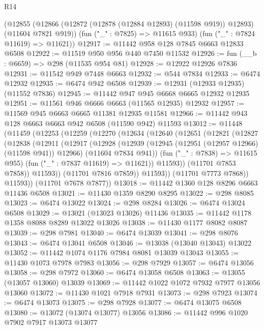 \begin{lexlean}{R14}
\begin{coremodule}
    (@12855
      (@12866 (@12872 (@12878 (@12884 @12893) (@11598 @919)) @12893) (@11604 @7821 @919))
      (fun ("_" : @7825) => @11615 @933)
      (fun ("_" : @7824 @11619) => @11621))
@12917 := @11442 @958 @128 @7845 @6663 @12833 @6508
@12922 := @11519 @950 @956 @440 @7450 @11532
@12926 := fun (__b : @6659) => @298 (@11535 @954 @81)
@12928 := @12922 @12926 @7836
@12931 := @11542 @949 @7448 @6663
@12932 := @544 @7834
@12933 := @6474 @12932
@12935 := @6474 @942 @6508
@12939 := @12931 (@12933 @12935) (@11552 @7836)
@12945 := @11442 @947 @945 @6668 @6665 @12932 @12935
@12951 := @11561 @946 @6666 @6663 (@11565 @12935) @12932
@12957 := @11569 @945 @6663 @6665 @11381 @12935 @11581
@12966 := @11442 @943 @128 @6663 @6663 @942 @6508 (@11590 @942) @11593
@13012 := @11448
    (@11459
      (@12253
        (@12259
          (@12270
            (@12634
              (@12640
                (@12651
                  (@12821
                    (@12827
                      (@12838
                        (@12911
                          (@12917
                            (@12928
                              (@12939
                                (@12945 (@12951 (@12957 @12966) (@11598 @941)) @12966)
                                (@11604 @7834 @941))
                              (fun ("_" : @7838) => @11615 @955)
                              (fun ("_" : @7837 @11619) => @11621))
                            @11593))
                        (@11701 @7853 @7858))
                      @11593))
                  (@11701 @7816 @7859))
                @11593))
            (@11701 @7773 @7868))
          @11593))
      (@11701 @7678 @7877))
@13018 := @11442 @1360 @128 @8296 @6663 @11436 @6508
@13021 := @11430 @1359 @8290 @8295
@13022 := @298 @8085
@13023 := @6474 @13022
@13024 := @298 @8284
@13026 := @6474 @13024 @6508
@13029 := @13021 (@13023 @13026) @11436
@13035 := @11442 @1178 @1358 @8088 @8289 @13022 @13026
@13038 := @11430 @1177 @8082 @8087
@13039 := @298 @7981
@13040 := @6474 @13039
@13041 := @298 @8076
@13043 := @6474 @13041 @6508
@13046 := @13038 (@13040 @13043) @13022
@13052 := @11442 @1074 @1176 @7984 @8081 @13039 @13043
@13055 := @11430 @1073 @7978 @7983
@13056 := @298 @7929
@13057 := @6474 @13056
@13058 := @298 @7972
@13060 := @6474 @13058 @6508
@13063 := @13055 (@13057 @13060) @13039
@13069 := @11442 @1022 @1072 @7932 @7977 @13056 @13060
@13072 := @11430 @1021 @7918 @7931
@13073 := @298 @7923
@13074 := @6474 @13073
@13075 := @298 @7928
@13077 := @6474 @13075 @6508
@13080 := @13072 (@13074 @13077) @13056
@13086 := @11442 @996 @1020 @7902 @7917 @13073 @13077

\end{coremodule}
\end{lexlean}
